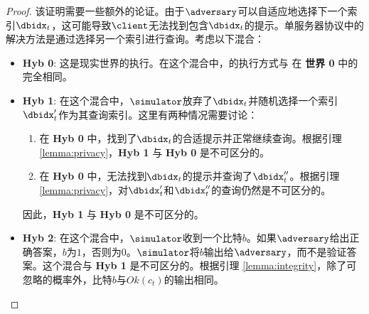 \begin{proof}
    该证明需要一些额外的论证。由于$\adversary$可以自适应地选择下一个索引$\dbidx_t$，这可能导致$\client$无法找到包含$\dbidx_t$的提示。单服务器协议中的解决方法是通过选择另一个索引进行查询。考虑以下混合：
    
    \begin{itemize}
        \item \textbf{Hyb 0}: 这是现实世界的执行。在这个混合中，\simulator 的执行方式与 \client 在 \textbf{世界 0} 中的完全相同。
        \item \textbf{Hyb 1}: 在这个混合中，$\simulator$放弃了$\dbidx_t$并随机选择一个索引$\dbidx_t'$作为其查询索引。这里有两种情况需要讨论：
        \begin{enumerate}
            \item 在 \textbf{Hyb 0} 中，\simulator 找到了$\dbidx_t$的合适提示并正常继续查询。根据引理 \ref{lemma:privacy}，\textbf{Hyb 1} 与 \textbf{Hyb 0} 是不可区分的。
            \item 在 \textbf{Hyb 0} 中，\simulator 无法找到$\dbidx_t$的提示并查询了$\dbidx_t''$。根据引理 \ref{lemma:privacy}，对$\dbidx_t'$和$\dbidx_t''$的查询仍然是不可区分的。
        \end{enumerate}
        因此，\textbf{Hyb 1} 与 \textbf{Hyb 0} 是不可区分的。
        \item \textbf{Hyb 2}: 在这个混合中，$\simulator$收到一个比特$b$。如果$\adversary$给出正确答案，$b$为$1$，否则为$0$。$\simulator$将$b$输出给$\adversary$，而不是验证答案。这个混合与 \textbf{Hyb 1} 是不可区分的。根据引理 \ref{lemma:integrity}，除了可忽略的概率外，比特$b$与$Ok(c_t)$的输出相同。
    \end{itemize}
\end{proof}


